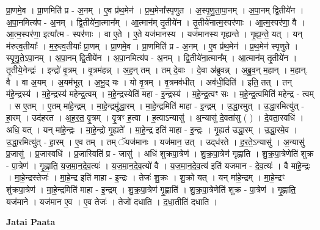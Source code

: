 \documentclass[17pt]{extarticle}
\begin{document}
प्रा॒णमे॒व । प्रा॒णमिति॑ प्र - अ॒नम् । ए॒व प्र॑थ॒मेन॑ । प्र॒थ॒मेना᳚स्पृणुत । अ॒स्पृ॒णु॒ता॒पा॒नम् । अ॒पा॒नम् द्वि॒तीये॑न । अ॒पा॒नमित्य॑प - अ॒नम् । द्वि॒तीये॑ना॒त्मान᳚म् । आ॒त्मान॑म् तृ॒तीये॑न । तृ॒तीये॑नात्म॒स्पर॑णाः । आ॒त्म॒स्पर॑णा॒ वै । आ॒त्म॒स्पर॑णा॒ इत्या᳚त्म - स्पर॑णाः । वा ए॒ते । ए॒ते यज॑मानस्य । यज॑मानस्य गृह्यन्ते । गृ॒ह्य॒न्ते॒ यत् । यन् म॑रुत्व॒तीयाः᳚ । म॒रु॒त्व॒तीयाः᳚ प्रा॒णम् । प्रा॒णमे॒व । प्रा॒णमिति॑ प्र - अ॒नम् । ए॒व प्र॑थ॒मेन॑ । प्र॒थ॒मेन॑ स्पृणुते । स्पृ॒णु॒ते॒ऽपा॒नम् । अ॒पा॒नम् द्वि॒तीये॑न । अ॒पा॒नमित्य॑प - अ॒नम् । द्वि॒तीये॑ना॒त्मान᳚म् । आ॒त्मान॑म् तृ॒तीये॑न । तृ॒तीये॒नेन्द्रः॑ । इन्द्रो॑ वृ॒त्रम् । वृ॒त्रम॑हन्न् । अ॒ह॒न् तम् । तम् दे॒वाः । दे॒वा अ॑ब्रुवन्न् । अ॒ब्रु॒व॒न् म॒हान् । म॒हान्. वै । वा अ॒यम् । अ॒यम॑भूत् । अ॒भू॒द् यः । यो वृ॒त्रम् । वृ॒त्रमव॑धीत् । अव॑धी॒दिति॑ । इति॒ तत् । तन् म॑हे॒न्द्रस्य॑ । म॒हे॒न्द्रस्य॑ महेन्द्र॒त्वम् । म॒हे॒न्द्रस्येति॑ महा - इ॒न्द्रस्य॑ । म॒हे॒न्द्र॒त्वꣳ सः । म॒हे॒न्द्र॒त्वमिति॑ महेन्द्र - त्वम् । स ए॒तम् । ए॒तम् मा॑हे॒न्द्रम् । मा॒हे॒न्द्रमु॑द्धा॒रम् । मा॒हे॒न्द्रमिति॑ माहा - इ॒न्द्रम् । उ॒द्धा॒रमुत् । उ॒द्धा॒रमित्यु॑त् - हा॒रम् । उद॑हरत । अ॒ह॒र॒त॒ वृ॒त्रम् । वृ॒त्रꣳ ह॒त्वा । ह॒त्वाऽन्यासु॑ । अ॒न्यासु॑ दे॒वता॑सु ( ) । दे॒वता॒स्वधि॑ । अधि॒ यत् । यन् मा॑हे॒न्द्रः । मा॒हे॒न्द्रो गृ॒ह्यते᳚ । मा॒हे॒न्द्र इति॑ माहा - इ॒न्द्रः । गृ॒ह्यत॑ उद्धा॒रम् । उ॒द्धा॒रमे॒व । उ॒द्धा॒रमित्यु॑त् - हा॒रम् । ए॒व तम् । तम् ॅयज॑मानः । यज॑मान॒ उत् । उद्‌ध॑रते । ह॒र॒ते॒ऽन्यासु॑ । अ॒न्यासु॑ प्र॒जासु॑ । प्र॒जास्वधि॑ । प्र॒जास्विति॑ प्र - जासु॑ । अधि॑ शुक्रपा॒त्रेण॑ । शु॒क्र॒पा॒त्रेण॑ गृह्णाति । शु॒क्र॒पा॒त्रेणेति॑ शुक्र - पा॒त्रेण॑ । गृ॒ह्णा॒ति॒ य॒ज॒मा॒न॒दे॒व॒त्यः॑ । य॒ज॒मा॒न॒दे॒व॒त्यो॑ वै । य॒ज॒मा॒न॒दे॒व॒त्य॑ इति॑ यजमान - दे॒व॒त्यः॑ । वै मा॑हे॒न्द्रः । मा॒हे॒न्द्रस्तेजः॑ । मा॒हे॒न्द्र इति॑ माहा - इ॒न्द्रः । तेजः॑ शु॒क्रः । शु॒क्रो यत् । यन् मा॑हे॒न्द्रम् । मा॒हे॒न्द्रꣳ शु॑क्रपा॒त्रेण॑ । मा॒हे॒न्द्रमिति॑ माहा - इ॒न्द्रम् । शु॒क्र॒पा॒त्रेण॑ गृ॒ह्णाति॑ । शु॒क्र॒पा॒त्रेणेति॑ शुक्र - पा॒त्रेण॑ । गृ॒ह्णाति॒ यज॑माने । यज॑मान ए॒व । ए॒व तेजः॑ । तेजो॑ दधाति । द॒धा॒तीति॑ दधाति । \newline

\textbf{Jatai Paata} \newline
\end{document}
